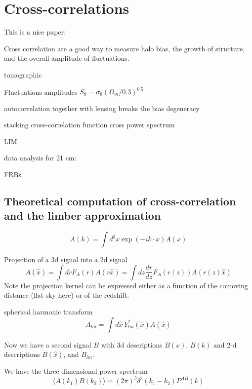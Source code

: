 \chapter{Cross-correlations}\label{ch:cross_correlations}
 
This is a nice paper: \citep{2024JCAP...02..003G}

\citep{2014PhRvD..90f3515N}


Cross correlation are a good way to measure halo bias, the growth of structure, and the overall amplitude of fluctuations.

tomographic

Fluctuations amplitudes $S_8 = \sigma_8 (\Omega_m /0.3)^{0.5}$

autocorrelation together with lensing breaks the bias degeneracy

stacking
cross-correlation function
cross power spectrum

LIM


data analysis for 21 cm: \citep{2020PASP..132f2001L}


FRBs


\section{Theoretical computation of cross-correlation and the limber approximation}

\begin{equation}
  A(k) = \int d^3x \exp(-i k \cdot x) A(x)
\end{equation}

Projection of a 3d signal into a 2d signal
\begin{equation}
  A(\hat x) = \int dr F_A(r) A(r \hat x) = \int dz \frac{dr}{dz} F_A(r(z)) A(r(z) \hat x)
\end{equation}
Note the projection kernel can be expressed either as a function of the comoving distance (flat sky here) or of the redshift.

spherical harmonic transform
\begin{equation}
  A_{lm} = \int d\hat x\, Y^*_{lm}(\hat x) A(\hat x)
\end{equation}

Now we have a second signal $B$ with 3d descriptions $B(x)$, $B(k)$ and 2-d descriptions  $B(\hat x)$, and $B_{lm}$.

We have the three-dimensional power spectrum
\begin{equation}
  \langle A(k_1) B(k_2) \rangle = (2\pi)^3 \delta^3(k_1- k_2) P^{AB}(k)
\end{equation}

